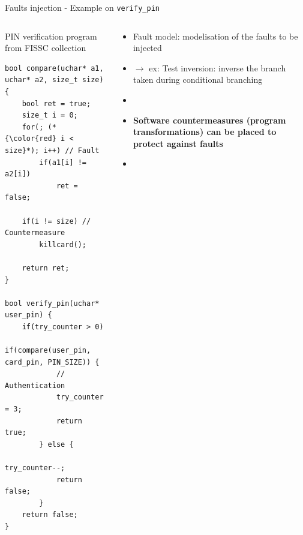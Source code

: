 \begin{frame}{Faults injection - Example on \texttt{verify\_pin}}
    \begin{columns}
        \begin{column}{0.55\textwidth}
            \begin{small}
                PIN verification program from FISSC \cite{Dureuil/PPLCC16} collection                
            \end{small}
            
            \vspace{0.2cm}
            
            \begin{lstlisting}
bool compare(uchar* a1, uchar* a2, size_t size)
{
    bool ret = true;
    size_t i = 0; 
    for(; (*{\color{red} i < size}*); i++) // Fault
        if(a1[i] != a2[i])
            ret = false;
            
    if(i != size) // Countermeasure
        killcard(); 
        
    return ret;
}

bool verify_pin(uchar* user_pin) {
    if(try_counter > 0)  
        if(compare(user_pin, card_pin, PIN_SIZE)) {
            // Authentication
            try_counter = 3;
            return true;
        } else {
            try_counter--;
            return false;
        }
    return false;
}
            \end{lstlisting}	
        	\vfill
        \end{column}
        \begin{column}{0.45\textwidth}
        	\begin{small}
                 \begin{itemize}
                     \item Fault model: modelisation of the faults to be injected
                     \item[] $\rightarrow$ ex: Test inversion: inverse the branch taken during conditional branching
                     \item[]
                     \item \textbf{Software countermeasures (program transformations) can be placed to protect against faults}
                     \item[]
                 \end{itemize}
    	    \end{small}
            \vfill
        \end{column}
    \end{columns}
\end{frame}

